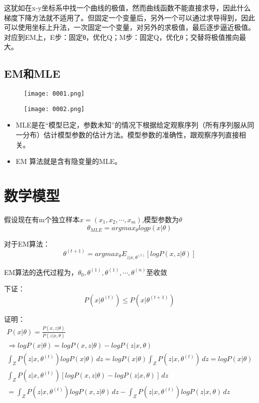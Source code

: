 \documentclass[12pt]{article}
\begin{document}
这犹如在x-y坐标系中找一个曲线的极值，然而曲线函数不能直接求导，因此什么梯度下降方法就不适用了。但固定一个变量后，另外一个可以通过求导得到，因此可以使用坐标上升法，一次固定一个变量，对另外的求极值，最后逐步逼近极值。对应到EM上，E步：固定θ，优化Q；M步：固定Q，优化θ；交替将极值推向最大。


\subsection{EM和MLE}

\begin{figure}[H]
	\centering
	\texttt{[image: 0001.png]}
\end{figure}

\begin{figure}[H]
	\centering
	\texttt{[image: 0002.png]}
\end{figure}
\begin{itemize}
	\item MLE是在“模型已定，参数未知”的情况下根据给定观察序列（所有序列服从同一分布）估计模型参数的估计方法。模型参数的准确性，跟观察序列直接相关。
	\item EM 算法就是含有隐变量的MLE。
\end{itemize}


\section{数学模型}
假设现在有m个独立样本$x=(x_1,x_2,\cdots,x_m)$,模型参数为$\theta$
\begin{equation}\nonumber
	\theta_{MLE}=argmax_\theta log p(x|\theta)
\end{equation}

对于EM算法：
\begin{equation}\nonumber
	\theta^{(t+1)}=arg max _\theta E_{z|x,\theta^{(t)}}[log P(x,z|\theta)]
\end{equation}

EM算法的迭代过程为，$\theta_0,\theta^{(1)},\theta^{(1)},\cdots,\theta^{(n)}$至收敛

下证：
\begin{equation}\nonumber
	P(x|\theta^{(t)})\leq P(x|\theta^{(t+1)})
\end{equation}

证明：
\begin{gather}\nonumber
	P(x|\theta)=\frac{P(x,z|\theta)}{P(z|x,\theta)}\\
	\Rightarrow log P(x|\theta)=log P(x,z|\theta)-log P(z|x,\theta)\\
	\int_{Z} P(z|x,\theta^{(t)}) log P(x|\theta) \,dz=log P(x|\theta)\int_{Z} P(z|x,\theta^{(t)}) \,dz=log P(x|\theta)\\
    \int_{Z} P(z|x,\theta^{(t)}) [log P(x,z|\theta)-log P(z|x,\theta)] \,dz \\
	=\int_{Z} P(z|x,\theta^{(t)}) log P(x,z|\theta) \,dz-\int_{Z} P(z|x,\theta^{(t)}) log P(z|x,\theta) \,dz
\end{gather}
\end{document}
